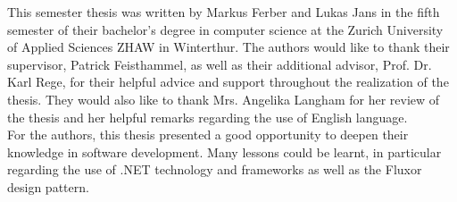 
This semester thesis was written by Markus Ferber and Lukas Jans in the fifth semester of their bachelor's degree in computer science at the Zurich University of Applied Sciences ZHAW in Winterthur. The authors would like to thank their supervisor, Patrick Feisthammel, as well as their additional advisor, Prof. Dr. Karl Rege, for their helpful advice and support throughout the realization of the thesis. They would also like to thank Mrs. Angelika Langham for her review of the thesis and her helpful remarks regarding the use of English language.\\
For the authors, this thesis presented a good opportunity to deepen their knowledge in software development. Many lessons could be learnt, in particular regarding the use of .NET technology and frameworks as well as the Fluxor design pattern.